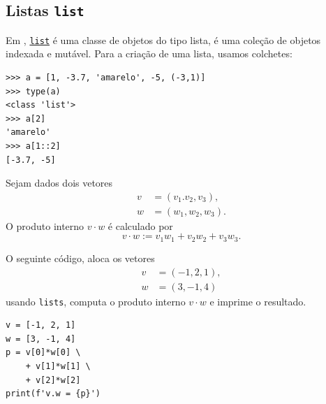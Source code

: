 \subsection{Listas \texttt{list}}

Em {\python}, \href{https://docs.python.org/3/library/stdtypes.html\#lists}{\lstinline+list+} é uma classe de objetos do tipo lista, é uma coleção de objetos indexada e mutável. Para a criação de uma lista, usamos colchetes:

\begin{lstlisting}
>>> a = [1, -3.7, 'amarelo', -5, (-3,1)] 
>>> type(a)
<class 'list'>
>>> a[2]
'amarelo'
>>> a[1::2]
[-3.7, -5]
\end{lstlisting}

\begin{ex}
  Sejam dados dois vetores
  \begin{align}
    v &= (v_1. v_2, v_3),\\
    w &= (w_1, w_2, w_3).
  \end{align}
  O produto interno $v\cdot w$ é calculado por
  \begin{equation}
    v\cdot w := v_1w_1 + v_2w_2 + v_3w_3.
  \end{equation}

  O seguinte código, aloca os vetores
  \begin{align}
    v &= (-1, 2, 1),\\
    w &= (3, -1, 4)
  \end{align}
  usando \lstinline+lists+, computa o produto interno $v\cdot w$ e imprime o resultado.

\begin{lstlisting}
v = [-1, 2, 1]
w = [3, -1, 4]
p = v[0]*w[0] \
    + v[1]*w[1] \
    + v[2]*w[2]
print(f'v.w = {p}')
\end{lstlisting}

\end{ex}

